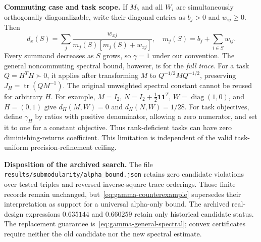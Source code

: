 \textbf{Commuting case and task scope.} If $M_b$ and all $W_i$ are simultaneously orthogonally diagonalizable, write their diagonal entries as $b_j>0$ and $w_{ij}\geq0$. Then
\begin{equation}
d_x(S)=\sum_j\frac{w_{xj}}{m_j(S)[m_j(S)+w_{xj}]},\quad
m_j(S)=b_j+\sum_{i\in S}w_{ij}.
\end{equation}
Every summand decreases as $S$ grows, so $\gamma=1$ under our convention. The general noncommuting spectral bound, however, is for the \emph{full trace}. For a task $Q=H^TH\succ0$, it applies after transforming $M$ to $Q^{-1/2}MQ^{-1/2}$, preserving $J_H=\operatorname{tr}(Q M^{-1})$. The original unweighted spectral constant cannot be reused for arbitrary $H$. For example, $M=I_2$, $N=I_2+\tfrac12\mathbf1\mathbf1^T$, $W=\operatorname{diag}(1,0)$, and $H=(0,1)$ give $d_H(M,W)=0$ and $d_H(N,W)=1/28$. For task objectives, define $\gamma_H$ by ratios with positive denominator, allowing a zero numerator, and set it to one for a constant objective. Thus rank-deficient tasks can have zero diminishing-returns coefficient. This limitation is independent of the valid task-uniform precision-refinement ceiling.

\textbf{Disposition of the archived search.} The file \nolinkurl{results/submodularity/alpha_bound.json} retains zero candidate violations over \alphaTestTriples{} tested triples and \alphaMInvSqReversalTriples{} reversed inverse-square trace orderings. Those finite records remain unchanged, but~\eqref{eq:gamma-counterexample} supersedes their interpretation as support for a universal alpha-only bound. The archived real-design expressions $0.635144$ and $0.660259$ retain only historical candidate status. The replacement guarantee is~\eqref{eq:gamma-general-spectral}; convex certificates require neither the old candidate nor the new spectral estimate.
